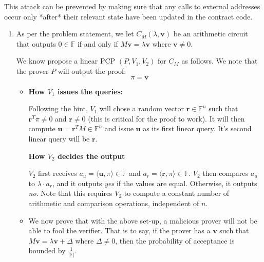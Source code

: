 \documentclass[12pt]{exam}
\newcommand{\Q}[1]{\question{\large{\textbf{#1}}}}
\begin{document}
\begin{questions}
\begin{solution}
  This attack can be prevented by making sure that any calls to external addresses occur only *after* their relevant state have been updated in the contract code.
\end{solution}

\newpage
\Q{Problem 4}
\begin{solution}
  \begin{enumerate}[label=\textbf{\alph*.}]
    \item As per the problem statement, we let $C_M(\lambda, \textbf{v})$ be an arithmetic circuit that outputs $0 \in \mathbb{F}$ if and only if $M\textbf{v} = \lambda \textbf{v}$ where $\textbf{v} \neq 0$.

    We know propose a linear PCP $(P, V_1, V_2)$ for $C_M$ as follows. We note that the prover $P$ will output the proof:
      \[
        \pi = \textbf{v}
      \]
    \begin{itemize}
      \item 

      \textbf{How $V_1$ issues the queries:}

      Following the hint, $V_1$ will chose a random vector $\textbf{r} \in \mathbb{F}^n$ such that $\textbf{r}^T \pi \neq 0$ and $\textbf{r} \neq 0$ (this is critical for the proof to work). It will then compute $\textbf{u} = \textbf{r}^TM \in \mathbb{F}^n$ and issue $\textbf{u}$ as its first linear query. It's second linear query will be $\textbf{r}$.

      \textbf{How $V_2$ decides the output}

      $V_2$ first receives $a_u = \langle \textbf{u}, \pi \rangle \in \mathbb{F}$ and $a_r = \langle \textbf{r}, \pi \rangle \in \mathbb{F}$. $V_2$ then compares $a_u$ to $\lambda \cdot a_r$, and it outputs \textit{yes} if the values are equal. Otherwise, it outputs \textit{no}. Note that this requires $V_2$ to compute a constant number of arithmetic and comparison operations, independent of $n$.

      \item 

      We now prove that with the above set-up, a malicious prover will not be able to fool the verifier. That is to say, if the prover has a $\textbf{v}$ such that $M\textbf{v}= \lambda \textbf{v} + \Delta$ where $\Delta \neq 0$, then the probability of acceptance is bounded by $\frac{1}{|\mathbb{F}|}$. 


\end{itemize}
\end{enumerate}
\end{solution}
\end{questions}
\end{document}
